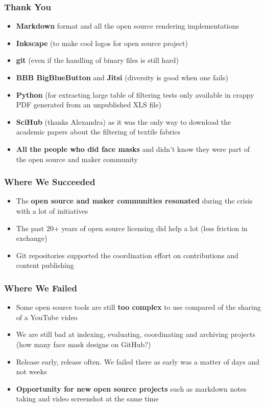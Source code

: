 \documentclass{beamer}
\begin{document}
\begin{frame}[fragile]
        \frametitle{Thank You}
        \begin{itemize}
                \item {\bf Markdown} format and all the open source rendering implementations
                \item {\bf Inkscape} (to make cool logos for open source project)
                \item {\bf git} (even if the handling of binary files is still hard)
                \item {\bf BBB BigBlueButton} and {\bf Jitsi} (diversity is good when one fails)
                \item {\bf Python} (for extracting large table of filtering tests only available in crappy PDF generated from an unpublished XLS file)
                \item {\bf SciHub} (thanks Alexandra) as it was the only way to download the academic papers about the filtering of textile fabrics
                \item {\bf All the people who did face masks} and didn't know they were part of the open source and maker community
        \end{itemize}
\end{frame}


\begin{frame}[fragile]
        \frametitle{Where We Succeeded}
        \begin{itemize}
                \item The {\bf open source and maker communities resonated} during the crisis with a lot of initiatives
                \item The past 20+ years of open source licensing did help a lot (less friction in exchange)
                \item Git repositories supported the coordination effort on contributions and content publishing
        \end{itemize}
\end{frame}

\begin{frame}[fragile]
        \frametitle{Where We Failed}
        \begin{itemize}
                \item Some open source tools are still {\bf too complex} to use compared of the sharing of a YouTube video
                \item We are still bad at indexing, evaluating, coordinating and archiving projects (how many face mask designs on GitHub?)
                \item Release early, release often. We failed there as early was a matter of days and not weeks
                \item {\bf Opportunity for new open source projects} such as markdown notes taking and video screenshot at the same time
        \end{itemize}
\end{frame}
\end{document}

